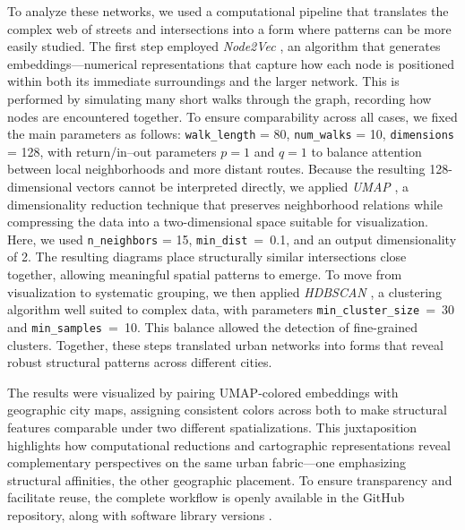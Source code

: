 \documentclass[land,article,accept,pdftex,oneauthor]{Definitions/mdpi}
\begin{document}
{To analyze these networks, we used a computational pipeline that translates the complex web of streets and intersections into a form where patterns can be more easily studied. The first step employed \textit{Node2Vec} \cite{grover_node2vec_2016}, an algorithm that generates embeddings---numerical representations that capture how each node is positioned within both its immediate surroundings and the larger network. This is performed by simulating many short walks through the graph, recording how nodes are encountered together. To ensure comparability across all cases, we fixed the main parameters as follows:  \texttt{walk\_length}  %
= 80, \texttt{num\_walks} = 10, \texttt{dimensions} = 128, with return/in--out parameters $p = 1$ and $q = 1$ to balance attention between local neighborhoods and more distant routes. Because the resulting 128-dimensional vectors cannot be interpreted directly, we applied \textit{UMAP} \cite{mcinnes_umap_2018}, a dimensionality reduction technique that preserves neighborhood relations while compressing the data into a two-dimensional space suitable for visualization. Here, we used \texttt{n\_neighbors} = 15, \mbox{\texttt{min\_dist} = 0.1}, and an output dimensionality of 2. The resulting diagrams place structurally similar intersections close together, allowing meaningful spatial patterns to emerge. To move from visualization to systematic grouping, we then applied \textit{HDBSCAN} \cite{mcinnes_hdbscan_2017}, a clustering algorithm well suited to complex data, with parameters \mbox{\texttt{min\_cluster\_size} = 30} and \mbox{\texttt{min\_samples} = 10.} This balance allowed the detection of fine-grained clusters. Together, these steps translated urban networks into forms that reveal robust structural patterns across different cities.

The results were visualized by pairing UMAP-colored embeddings with geographic city maps, assigning consistent colors across both to make structural features comparable under two different spatializations. This juxtaposition highlights how computational reductions and cartographic representations reveal complementary perspectives on the same urban fabric---one emphasizing structural affinities, the other geographic placement. To ensure transparency and facilitate reuse, the complete workflow is openly available in the  {GitHub} %
 repository, along with software library versions \cite{rodighiero_urban-mapper_2025}.

}
\end{document}
